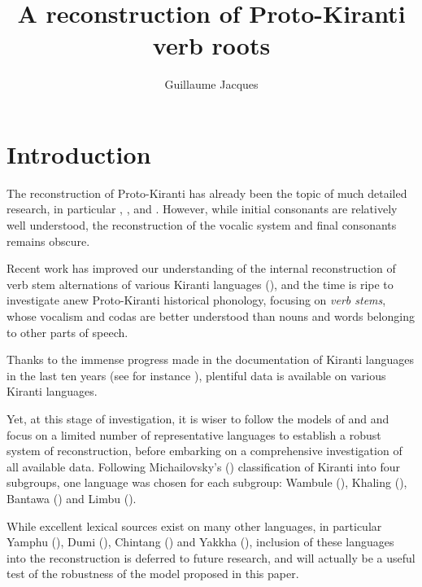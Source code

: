 \documentclass[oldfontcommands,oneside,a4paper,11pt]{article}
\begin{document}
\title{A reconstruction of Proto-Kiranti verb roots}
\author{Guillaume Jacques}
\maketitle
\sloppy
\section{Introduction}
The reconstruction of Proto-Kiranti has already been the topic of much detailed research, in particular \citet{starostin94kiranti}, \citet{michailovsky94stops}, \citet{opgenort05jero} and \citet{michailovsky10kiranti}. However, while  initial consonants are relatively well understood, the reconstruction of the vocalic system and final consonants remains obscure.  

Recent work has improved our understanding of the internal reconstruction of verb stem alternations of various Kiranti languages (\citealt{michailovsky02dico, lahaussois11thulung, jacques12khaling, michailovsky12dumi}), and the time is ripe to investigate anew Proto-Kiranti historical phonology, focusing on \textit{verb stems}, whose vocalism and codas are better understood than nouns and words belonging to other parts of speech.

Thanks to the immense progress made in the documentation of Kiranti languages in the last ten years (see for instance \citealt{bickel07chintang, bickel07puma, schackow08puma, doornenbal09, lahaussois09, huysmans2011sampang, schackow15yakkha}), plentiful data is available on various Kiranti languages. 

Yet, at this stage of investigation, it is wiser to follow the models of \citet{bloomfield25central} and \citet{dempwolff34induktiver} and focus on a limited number of representative languages to establish a robust system of reconstruction, before embarking on a comprehensive investigation of all available data. Following Michailovsky's (\citeyear{michailovsky94stops}) classification of Kiranti into four subgroups, one language was chosen for each subgroup: Wambule (\citealt{opgenort04wambule}), Khaling (\citealt{jacques12khaling, jacques15khaling}), Bantawa (\citealt{doornenbal09}) and Limbu (\citealt{driem87, michailovsky02dico}). 

While excellent lexical sources exist on many other languages, in particular  Yamphu (\citealt{rutgers98yamphu}), Dumi  (\citealt{driem93dumi, rai11dumi}), Chintang  (\citealt{rai11chintang}) and  Yakkha  (\citealt{kongren07yakkha}), inclusion of these languages into the reconstruction is deferred to future research, and will actually be a useful test of the robustness of the model proposed in this paper.
\end{document}
